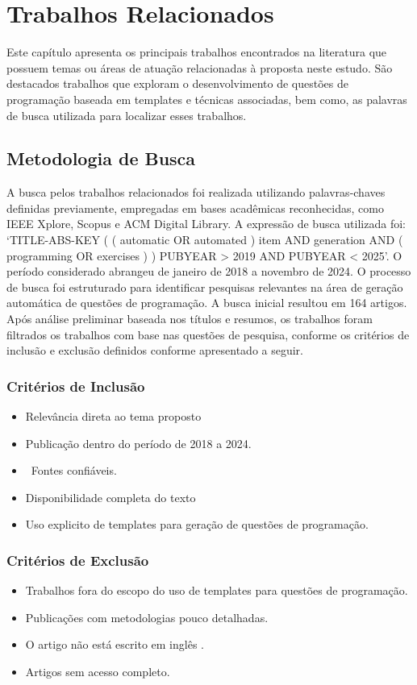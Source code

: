 \chapter{Trabalhos Relacionados}\label{cap:trabalhos-relacionados}

Este capítulo apresenta os principais trabalhos encontrados na literatura que possuem temas ou áreas de atuação relacionadas à proposta neste estudo. São destacados trabalhos que exploram o desenvolvimento de questões de programação baseada em templates e técnicas associadas, bem como, as palavras de busca utilizada para localizar esses trabalhos.



\section{Metodologia de Busca}

A busca pelos trabalhos relacionados foi realizada utilizando palavras-chaves definidas previamente, empregadas em bases acadêmicas reconhecidas, como IEEE Xplore, Scopus e ACM Digital Library. A expressão de busca utilizada foi: `TITLE-ABS-KEY ( ( automatic OR automated ) item AND generation AND ( programming OR exercises ) ) PUBYEAR > 2019 AND PUBYEAR < 2025'. O período considerado abrangeu de janeiro de 2018 a novembro de 2024.  O processo de busca foi estruturado para identificar pesquisas relevantes na área de geração automática de questões de programação. A busca inicial resultou em 164 artigos. Após análise preliminar baseada nos títulos e resumos, os trabalhos foram filtrados  os trabalhos com base nas questões de pesquisa, conforme os critérios de inclusão e exclusão definidos conforme apresentado a seguir. 

\subsection{Critérios de Inclusão}
\begin{itemize}
    \item Relevância direta ao tema proposto
    \item Publicação dentro do período de 2018 a 2024.
    \item   Fontes confiáveis.
    \item  Disponibilidade completa do texto
    \item Uso explicito de templates para geração de questões de programação.
\end{itemize}
\subsection{Critérios de Exclusão}
\begin{itemize}
    \item Trabalhos fora do escopo do uso de templates para questões de programação. 
    \item Publicações com metodologias pouco detalhadas. 
    \item O artigo não está escrito em inglês .
    \item Artigos sem acesso completo. 
\end{itemize}

